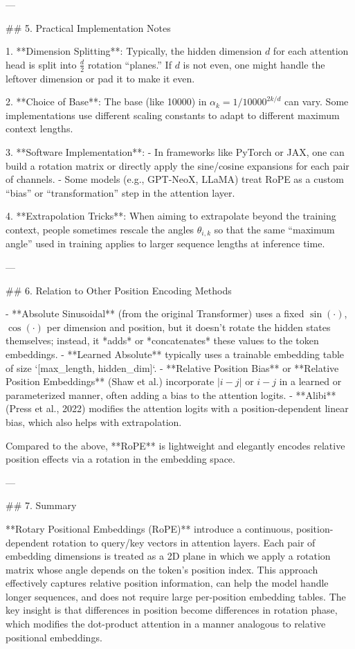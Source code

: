 ---

## 5. Practical Implementation Notes

1. **Dimension Splitting**:  
   Typically, the hidden dimension \(d\) for each attention head is split into \(\frac{d}{2}\) rotation “planes.” If \(d\) is not even, one might handle the leftover dimension or pad it to make it even.

2. **Choice of Base**:  
   The base (like 10000) in \(\alpha_k = 1/10000^{2k/d}\) can vary. Some implementations use different scaling constants to adapt to different maximum context lengths.

3. **Software Implementation**:  
   - In frameworks like PyTorch or JAX, one can build a rotation matrix or directly apply the sine/cosine expansions for each pair of channels.  
   - Some models (e.g., GPT-NeoX, LLaMA) treat RoPE as a custom “bias” or “transformation” step in the attention layer.

4. **Extrapolation Tricks**:  
   When aiming to extrapolate beyond the training context, people sometimes rescale the angles \(\theta_{i,k}\) so that the same “maximum angle” used in training applies to larger sequence lengths at inference time.

---

## 6. Relation to Other Position Encoding Methods

- **Absolute Sinusoidal** (from the original Transformer) uses a fixed \(\sin(\cdot)\), \(\cos(\cdot)\) per dimension and position, but it doesn’t rotate the hidden states themselves; instead, it *adds* or *concatenates* these values to the token embeddings.  
- **Learned Absolute** typically uses a trainable embedding table of size `[max_length, hidden_dim]`.  
- **Relative Position Bias** or **Relative Position Embeddings** (Shaw et al.) incorporate \(|i-j|\) or \(i-j\) in a learned or parameterized manner, often adding a bias to the attention logits.  
- **Alibi** (Press et al., 2022) modifies the attention logits with a position-dependent linear bias, which also helps with extrapolation.  

Compared to the above, **RoPE** is lightweight and elegantly encodes relative position effects via a rotation in the embedding space.

---

## 7. Summary

**Rotary Positional Embeddings (RoPE)** introduce a continuous, position-dependent rotation to query/key vectors in attention layers. Each pair of embedding dimensions is treated as a 2D plane in which we apply a rotation matrix whose angle depends on the token’s position index. This approach effectively captures relative position information, can help the model handle longer sequences, and does not require large per-position embedding tables. The key insight is that differences in position become differences in rotation phase, which modifies the dot-product attention in a manner analogous to relative positional embeddings.

